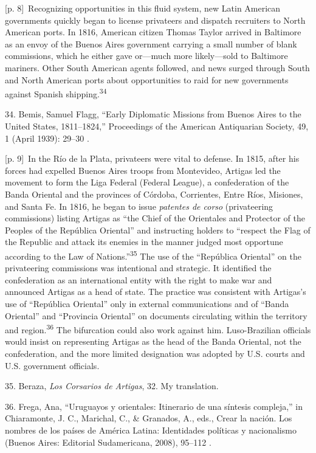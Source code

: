 \documentclass[10pt,a4paper]{article}
\begin{document}
{\scriptsize\color{gray} [p. 8]}\ Recognizing opportunities in this fluid system, new Latin American governments quickly began to license privateers and dispatch recruiters to North American ports. In 1816, American citizen Thomas Taylor arrived in Baltimore as an envoy of the Buenos Aires government carrying a small number of blank commissions, which he either gave or—much more likely—sold to Baltimore mariners. Other South American agents followed, and news surged through South and North American ports about opportunities to raid for new governments against Spanish shipping.\nobreak\textsuperscript{34}\par{\small 34. Bemis, Samuel Flagg, “Early Diplomatic Missions from Buenos Aires to the United States, 1811–1824,” Proceedings of the American Antiquarian Society, 49, 1 (April 1939): 29–30 .\par}
{\scriptsize\color{gray} [p. 9]}\ In the Río de la Plata, privateers were vital to defense. In 1815, after his forces had expelled Buenos Aires troops from Montevideo, Artigas led the movement to form the Liga Federal (Federal League), a confederation of the Banda Oriental and the provinces of Córdoba, Corrientes, Entre Ríos, Misiones, and Santa Fe. In 1816, he began to issue \textit{patentes de corso} (privateering commissions) listing Artigas as “the Chief of the Orientales and Protector of the Peoples of the República Oriental” and instructing holders to “respect the Flag of the Republic and attack its enemies in the manner judged most opportune according to the Law of Nations.”\nobreak\textsuperscript{35} The use of the “República Oriental” on the privateering commissions was intentional and strategic. It identified the confederation as an international entity with the right to make war and announced Artigas as a head of state. The practice was consistent with Artigas’s use of “República Oriental” only in external communications and of “Banda Oriental” and “Provincia Oriental” on documents circulating within the territory and region.\nobreak\textsuperscript{36} The bifurcation could also work against him. Luso-Brazilian officials would insist on representing Artigas as the head of the Banda Oriental, not the confederation, and the more limited designation was adopted by U.S. courts and U.S. government officials.\par{\small 35. Beraza, \textit{Los Corsarios de Artigas}, 32. My translation.\par}{\small 36. Frega, Ana, “Uruguayos y orientales: Itinerario de una síntesis compleja,” in Chiaramonte, J. C., Marichal, C., \& Granados, A., eds., Crear la nación. Los nombres de los países de América Latina: Identidades políticas y nacionalismo (Buenos Aires: Editorial Sudamericana, 2008), 95–112 .\par}
\end{document}
